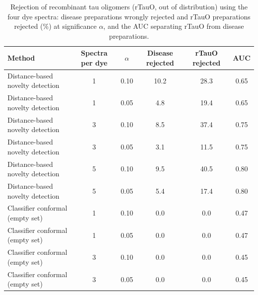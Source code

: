 \begin{table}[!htbp]
\centering\scriptsize
\caption{Rejection of recombinant tau oligomers (rTauO, out of distribution) using the four dye spectra: disease preparations wrongly rejected and rTauO preparations rejected (\%) at significance $\alpha$, and the AUC separating rTauO from disease preparations.}\label{tab:s_ood_reject}
\begin{tabular}{lccccc}
\toprule
\textbf{Method} & \textbf{Spectra per dye} & \textbf{$\alpha$} & \textbf{Disease rejected} & \textbf{rTauO rejected} & \textbf{AUC} \\
\midrule
Distance-based novelty detection & 1 & 0.10 & 10.2 & 28.3 & 0.65 \\
Distance-based novelty detection & 1 & 0.05 & 4.8 & 19.4 & 0.65 \\
Distance-based novelty detection & 3 & 0.10 & 8.5 & 37.4 & 0.75 \\
Distance-based novelty detection & 3 & 0.05 & 3.1 & 11.5 & 0.75 \\
Distance-based novelty detection & 5 & 0.10 & 9.5 & 40.5 & 0.80 \\
Distance-based novelty detection & 5 & 0.05 & 5.4 & 17.4 & 0.80 \\
Classifier conformal (empty set) & 1 & 0.10 & 0.0 & 0.0 & 0.47 \\
Classifier conformal (empty set) & 1 & 0.05 & 0.0 & 0.0 & 0.47 \\
Classifier conformal (empty set) & 3 & 0.10 & 0.0 & 0.0 & 0.45 \\
Classifier conformal (empty set) & 3 & 0.05 & 0.0 & 0.0 & 0.45 \\
\bottomrule
\end{tabular}
\end{table}

